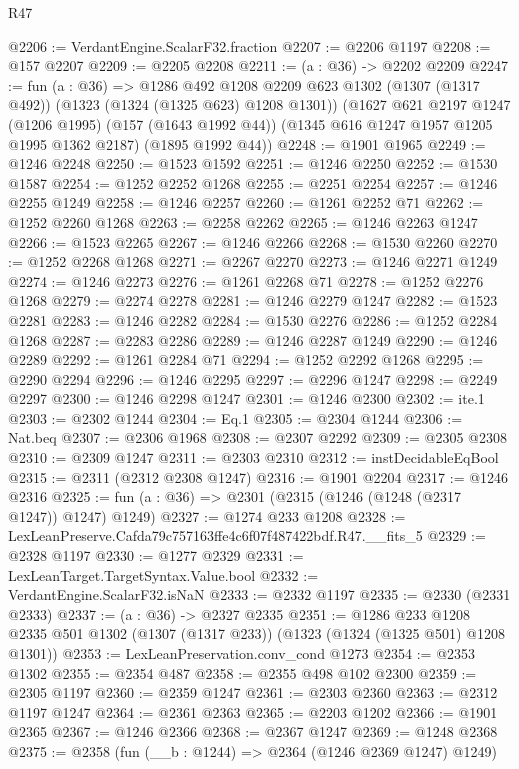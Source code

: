 \begin{lexlean}{R47}
\begin{coremodule}
@2206 := VerdantEngine.ScalarF32.fraction
@2207 := @2206 @1197
@2208 := @157 @2207
@2209 := @2205 @2208
@2211 := (a : @36) -> @2202 @2209
@2247 := fun (a : @36) =>
  @1286
    @492
    @1208
    @2209
    @623
    @1302
    (@1307 (@1317 @492))
    (@1323 (@1324 (@1325 @623) @1208 @1301))
    (@1627
      @621
      @2197
      @1247
      (@1206 @1995)
      (@157 (@1643 @1992 @44))
      (@1345 @616 @1247 @1957 @1205 @1995 @1362 @2187)
      (@1895 @1992 @44))
@2248 := @1901 @1965
@2249 := @1246 @2248
@2250 := @1523 @1592
@2251 := @1246 @2250
@2252 := @1530 @1587
@2254 := @1252 @2252 @1268
@2255 := @2251 @2254
@2257 := @1246 @2255 @1249
@2258 := @1246 @2257
@2260 := @1261 @2252 @71
@2262 := @1252 @2260 @1268
@2263 := @2258 @2262
@2265 := @1246 @2263 @1247
@2266 := @1523 @2265
@2267 := @1246 @2266
@2268 := @1530 @2260
@2270 := @1252 @2268 @1268
@2271 := @2267 @2270
@2273 := @1246 @2271 @1249
@2274 := @1246 @2273
@2276 := @1261 @2268 @71
@2278 := @1252 @2276 @1268
@2279 := @2274 @2278
@2281 := @1246 @2279 @1247
@2282 := @1523 @2281
@2283 := @1246 @2282
@2284 := @1530 @2276
@2286 := @1252 @2284 @1268
@2287 := @2283 @2286
@2289 := @1246 @2287 @1249
@2290 := @1246 @2289
@2292 := @1261 @2284 @71
@2294 := @1252 @2292 @1268
@2295 := @2290 @2294
@2296 := @1246 @2295
@2297 := @2296 @1247
@2298 := @2249 @2297
@2300 := @1246 @2298 @1247
@2301 := @1246 @2300
@2302 := ite.{1}
@2303 := @2302 @1244
@2304 := Eq.{1}
@2305 := @2304 @1244
@2306 := Nat.beq
@2307 := @2306 @1968
@2308 := @2307 @2292
@2309 := @2305 @2308
@2310 := @2309 @1247
@2311 := @2303 @2310
@2312 := instDecidableEqBool
@2315 := @2311 (@2312 @2308 @1247)
@2316 := @1901 @2204
@2317 := @1246 @2316
@2325 := fun (a : @36) => @2301 (@2315 (@1246 (@1248 (@2317 @1247)) @1247) @1249)
@2327 := @1274 @233 @1208
@2328 := LexLeanPreserve.Cafda79c757163ffe4c6f07f487422bdf.R47.__fits_5
@2329 := @2328 @1197
@2330 := @1277 @2329
@2331 := LexLeanTarget.TargetSyntax.Value.bool
@2332 := VerdantEngine.ScalarF32.isNaN
@2333 := @2332 @1197
@2335 := @2330 (@2331 @2333)
@2337 := (a : @36) -> @2327 @2335
@2351 := @1286
    @233
    @1208
    @2335
    @501
    @1302
    (@1307 (@1317 @233))
    (@1323 (@1324 (@1325 @501) @1208 @1301))
@2353 := LexLeanPreservation.conv_cond @1273
@2354 := @2353 @1302
@2355 := @2354 @487
@2358 := @2355 @498 @102 @2300
@2359 := @2305 @1197
@2360 := @2359 @1247
@2361 := @2303 @2360
@2363 := @2312 @1197 @1247
@2364 := @2361 @2363
@2365 := @2203 @1202
@2366 := @1901 @2365
@2367 := @1246 @2366
@2368 := @2367 @1247
@2369 := @1248 @2368
@2375 := @2358 (fun (__b : @1244) => @2364 (@1246 @2369 @1247) @1249)

\end{coremodule}
\end{lexlean}
